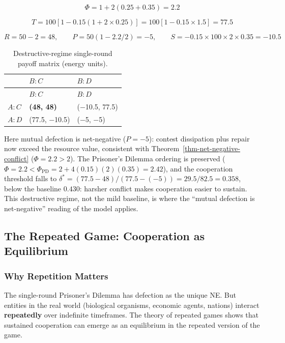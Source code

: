 \documentclass[11pt]{article}
\theoremstyle{plain}
\theoremstyle{definition}
\theoremstyle{remark}
\let\origsubsection\subsection
\renewcommand{\subsection}{\needspace{7\baselineskip}\origsubsection}
\let\origsubsubsection\subsubsection
\renewcommand{\subsubsection}{\needspace{4\baselineskip}\origsubsubsection}
\begin{document}
\[\Phi = 1 + 2(0.25 + 0.35) = 2.2\]

\[T = 100[1 - 0.15(1 + 2 \times 0.25)] = 100[1 - 0.15 \times 1.5] = 77.5\]

\[R = 50 - 2 = 48, \qquad P = 50(1 - 2.2/2) = -5, \qquad S = -0.15 \times 100 \times 2 \times 0.35 = -10.5\]

\begin{longtable}[]{@{}lll@{}}
\caption{Destructive-regime single-round payoff matrix (energy
units).}\tabularnewline
\toprule\noalign{}
& \(B: C\) & \(B: D\) \\
\midrule\noalign{}
\endfirsthead
\toprule\noalign{}
& \(B: C\) & \(B: D\) \\
\midrule\noalign{}
\endhead
\bottomrule\noalign{}
\endlastfoot
\(A: C\) & \textbf{(48, 48)} & (−10.5, 77.5) \\
\(A: D\) & (77.5, −10.5) & (−5, −5) \\
\end{longtable}

Here mutual defection is net-negative (\(P = -5\)): contest dissipation
plus repair now exceed the resource value, consistent with
Theorem~\ref{thm-net-negative-conflict} (\(\Phi = 2.2 > 2\)). The
Prisoner's Dilemma ordering is preserved
(\(\Phi = 2.2 < \Phi_{\text{PD}} = 2 + 4(0.15)(2)(0.35) = 2.42\)), and
the cooperation threshold falls to
\(\delta^* = (77.5 - 48)/(77.5 - (-5)) = 29.5/82.5 = 0.358\), below the
baseline \(0.430\): harsher conflict makes cooperation easier to
sustain. This destructive regime, not the mild baseline, is where the
``mutual defection is net-negative'' reading of the model applies.

\subsection{The Repeated Game: Cooperation as
Equilibrium}\label{the-repeated-game-cooperation-as-equilibrium}

\subsubsection{Why Repetition Matters}\label{why-repetition-matters}

The single-round Prisoner's Dilemma has defection as the unique NE. But
entities in the real world (biological organisms, economic agents,
nations) interact \textbf{repeatedly} over indefinite timeframes. The
theory of repeated games \citep{Fudenberg1986} shows that sustained
cooperation can emerge as an equilibrium in the repeated version of the
game.
\end{document}
